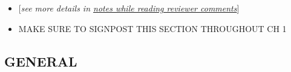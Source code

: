 \documentclass[11pt, twoside]{memoir}
\begin{document}


\begin{itemize}
\tightlist
\item
  {[}\emph{see more details in
  \href{https://docs.google.com/document/d/1PKhH5R25GfpMx1LtoxfF316u60uLDnYpyy8YTngGxVs/edit?tab=t.0}{notes
  while reading reviewer comments}}{]}\\
\item
  MAKE SURE TO SIGNPOST THIS SECTION THROUGHOUT CH 1
\end{itemize}

\hypertarget{general}{%
\subsection{\texorpdfstring{\textbf{GENERAL}}{GENERAL}}\label{general}}
\end{document}
